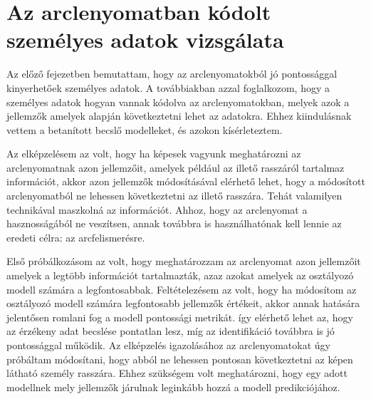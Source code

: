 \section{Az arclenyomatban kódolt személyes adatok vizsgálata} %
\label{sec:5}


Az előző fejezetben bemutattam, hogy az arclenyomatokból jó pontossággal kinyerhetőek személyes adatok. A továbbiakban azzal foglalkozom, hogy a személyes adatok hogyan vannak kódolva az arclenyomatokban, melyek azok a jellemzők amelyek alapján következtetni lehet az adatokra. Ehhez kiindulásnak vettem a betanított becslő modelleket, és azokon kísérleteztem.

Az elképzelésem az volt, hogy ha képesek vagyunk meghatározni az arclenyomatnak azon jellemzőit, amelyek például az illető rasszáról tartalmaz információt, akkor azon jellemzők módosításával elérhető lehet, hogy a módosított arclenyomatból ne lehessen következtetni az illető rasszára. Tehát valamilyen technikával maszkolná az információt. Ahhoz, hogy az arclenyomat a hasznosságából ne veszítsen, annak továbbra is használhatónak kell lennie az eredeti célra: az arcfelismerésre.

Első próbálkozásom az volt, hogy meghatározzam az arclenyomat azon jellemzőit amelyek a legtöbb információt tartalmazták, azaz azokat amelyek az osztályozó modell számára a legfontosabbak. Feltételezésem az volt, hogy ha módosítom az osztályozó modell számára legfontosabb jellemzők értékeit, akkor annak hatására jelentősen romlani fog a modell pontossági metrikát. így elérhető lehet az, hogy az érzékeny adat becslése pontatlan lesz, míg az identifikáció továbbra is jó pontossággal működik. Az elképzelés igazolásához az arclenyomatokat úgy próbáltam módosítani, hogy abból ne lehessen pontosan következtetni az képen látható személy rasszára. Ehhez szükségem volt meghatározni, hogy egy adott modellnek mely jellemzők járulnak leginkább hozzá a modell predikciójához.

